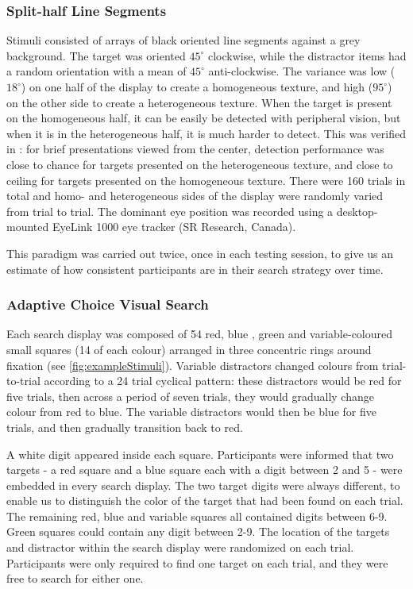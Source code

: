 \documentclass[Afour, sageapa, times]{sagej}
\begin{document}
\subsubsection{Split-half Line Segments}

Stimuli consisted of arrays of black oriented line segments against a grey background. The target was oriented $45^{\circ}$ clockwise, while the distractor items had a random orientation with a mean of $45^{\circ}$ anti-clockwise. The variance was low ($18^{\circ}$) on one half of the display to create a homogeneous texture, and high ($95^{\circ}$) on the other side to create a heterogeneous texture. When the target is present on the homogeneous half, it can be easily be detected with peripheral vision, but when it is in the heterogeneous half, it is much harder to detect. This was verified in \cite{nowakowska2017}: for brief presentations viewed from the center, detection performance was close to chance for targets presented on the heterogeneous texture, and close to ceiling for targets presented on the homogeneous texture. There were 160 trials in total and homo- and heterogeneous sides of the display were randomly varied from trial to trial. The dominant eye position was recorded using a desktop-mounted EyeLink 1000 eye tracker (SR Research, Canada). 

This paradigm was carried out twice, once in each testing session, to give us an estimate of how consistent participants are in their search strategy over time. 

\subsubsection{Adaptive Choice Visual Search}

Each search display was composed of 54 red, blue , green and variable-coloured small squares (14 of each colour) arranged in three concentric rings around fixation (see \ref{fig:exampleStimuli}). Variable distractors changed colours from trial-to-trial according to a 24 trial cyclical pattern: these distractors would be red for five trials, then across a period of seven trials, they would gradually change colour from red to blue. The variable distractors would then be blue for five trials, and then gradually transition back to red. 
 
A white digit appeared inside each square. Participants were informed that two targets - a red square and a blue square each with a digit between 2 and 5 - were embedded in every search display. The two target digits were always different, to enable us to distinguish the color of the target that had been found on each trial. The remaining red, blue and variable squares all contained digits between 6-9. Green squares could contain any digit between 2-9. The location of the targets and distractor within the search display were randomized on each trial. Participants were only required to find one target on each trial, and they were free to search for either one.   
\end{document}
